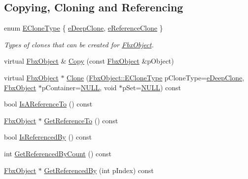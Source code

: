 \subsection*{Copying, Cloning and Referencing}
\begin{DoxyCompactItemize}
\item 
enum \hyperlink{class_fbx_object_a9f5626b2d2135684d6ea1e6e4ad2acbb}{E\+Clone\+Type} \{ \hyperlink{class_fbx_object_a9f5626b2d2135684d6ea1e6e4ad2acbbaacdf137ca059c572798287e98c4236d0}{e\+Deep\+Clone}, 
\hyperlink{class_fbx_object_a9f5626b2d2135684d6ea1e6e4ad2acbbae681cda4dccb3f5ccf260e5ccc47d88c}{e\+Reference\+Clone}
 \}\begin{DoxyCompactList}\small\item\em Types of clones that can be created for \hyperlink{class_fbx_object}{Fbx\+Object}. \end{DoxyCompactList}
\item 
virtual \hyperlink{class_fbx_object}{Fbx\+Object} \& \hyperlink{class_fbx_object_a0c0c5adb38284d14bb82c04d54504a3e}{Copy} (const \hyperlink{class_fbx_object}{Fbx\+Object} \&p\+Object)
\item 
virtual \hyperlink{class_fbx_object}{Fbx\+Object} $\ast$ \hyperlink{class_fbx_object_ad553a4262b09cb57c3171a93edadbab8}{Clone} (\hyperlink{class_fbx_object_a9f5626b2d2135684d6ea1e6e4ad2acbb}{Fbx\+Object\+::\+E\+Clone\+Type} p\+Clone\+Type=\hyperlink{class_fbx_object_a9f5626b2d2135684d6ea1e6e4ad2acbbaacdf137ca059c572798287e98c4236d0}{e\+Deep\+Clone}, \hyperlink{class_fbx_object}{Fbx\+Object} $\ast$p\+Container=\hyperlink{fbxarch_8h_a070d2ce7b6bb7e5c05602aa8c308d0c4}{N\+U\+LL}, void $\ast$p\+Set=\hyperlink{fbxarch_8h_a070d2ce7b6bb7e5c05602aa8c308d0c4}{N\+U\+LL}) const
\item 
bool \hyperlink{class_fbx_object_a5898e582711f3266ac3d0f779d541ef6}{Is\+A\+Reference\+To} () const
\item 
\hyperlink{class_fbx_object}{Fbx\+Object} $\ast$ \hyperlink{class_fbx_object_a1ba2b3e81083122497ab033c642cbfb8}{Get\+Reference\+To} () const
\item 
bool \hyperlink{class_fbx_object_af64184bd9341c8a3300588c818594328}{Is\+Referenced\+By} () const
\item 
int \hyperlink{class_fbx_object_a97318ba302685288321f65144063b7c7}{Get\+Referenced\+By\+Count} () const
\item 
\hyperlink{class_fbx_object}{Fbx\+Object} $\ast$ \hyperlink{class_fbx_object_a09291d887559a590239fedc4e772a4e8}{Get\+Referenced\+By} (int p\+Index) const
\end{DoxyCompactItemize}
